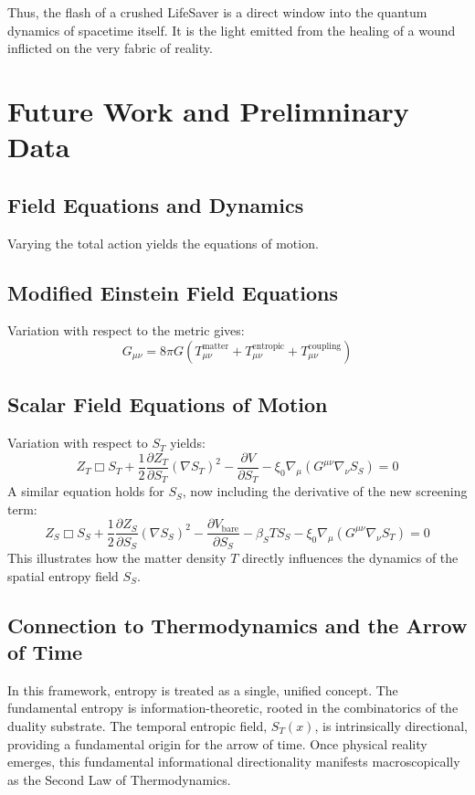 \documentclass[12pt, a4paper]{article}
\begin{document}
Thus, the flash of a crushed LifeSaver is a direct window into the quantum dynamics of spacetime itself. It is the light emitted from the healing of a wound inflicted on the very fabric of reality.

\section{Future Work and Prelimninary Data}
\subsection{Field Equations and Dynamics}
\label{sec:dynamics}

Varying the total action yields the equations of motion.

\subsection{Modified Einstein Field Equations}
Variation with respect to the metric gives:
\begin{equation}
G_{\mu\nu} = 8\pi G \left( T^{\text{matter}}_{\mu\nu} + T^{\text{entropic}}_{\mu\nu} + T^{\text{coupling}}_{\mu\nu} \right)
\end{equation}

\subsection{Scalar Field Equations of Motion}
Variation with respect to \( S_T \) yields:
\begin{equation}
Z_T \Box S_T + \frac{1}{2}\frac{\partial Z_T}{\partial S_T} (\nabla S_T)^2 - \frac{\partial V}{\partial S_T} - \xi_0 \nabla_\mu (G^{\mu\nu} \nabla_\nu S_S) = 0
\end{equation}
A similar equation holds for \(S_S\), now including the derivative of the new screening term:
\begin{equation}
Z_S \Box S_S + \frac{1}{2}\frac{\partial Z_S}{\partial S_S} (\nabla S_S)^2 - \frac{\partial V_{\text{bare}}}{\partial S_S} - \beta_S T S_S - \xi_0 \nabla_\mu (G^{\mu\nu} \nabla_\nu S_T) = 0
\end{equation}
This illustrates how the matter density \(T\) directly influences the dynamics of the spatial entropy field \(S_S\).

\subsection{Connection to Thermodynamics and the Arrow of Time}
In this framework, entropy is treated as a single, unified concept. The fundamental entropy is information-theoretic, rooted in the combinatorics of the duality substrate. The temporal entropic field, \(S_T(x)\), is intrinsically directional, providing a fundamental origin for the arrow of time. Once physical reality emerges, this fundamental informational directionality manifests macroscopically as the Second Law of Thermodynamics.
\end{document}
